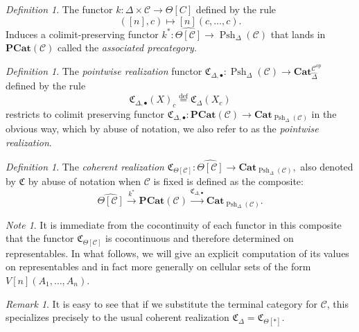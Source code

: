 \documentclass[leqno]{article}
\numberwithin{equation}{subsection}
\theoremstyle{plain}   %
\theoremstyle{remark}
\newtheorem{rem}[equation]{Remark}
\newtheorem{note}[equation]{Note}
\newtheorem{defn}[equation]{Definition}
\theoremstyle{plain}
\newcommand{\op}{\ensuremath{\mathrm{op}}}
\newcommand{\Cat}{\ensuremath{\mathbf{Cat}}}
\newcommand{\psh}[1]{\ensuremath{\widehat{#1}}}
\renewcommand{\C}{\ensuremath{\mathcal{C}}}
\newcommand{\defeq}{\overset{\mathrm{def}}=}
\newcommand{\cellset}{\ensuremath{\widehat{\Theta[\mathcal{C}]}}}
\newcommand{\spsh}{\ensuremath{\operatorname{Psh}_\Delta(\mathcal{C})}}
\begin{document}
\begin{defn}
	The functor \(k: \Delta \times \C\to \Theta[C]\) defined by the rule 
	\[
		([n],c) \mapsto [n](c,\dots,c).
	\]
	Induces a colimit-preserving functor \(k^\ast: \cellset \to \spsh\) that lands in \(\mathbf{PCat}(\C)\) called the \emph{associated precategory}.
\end{defn}

\begin{defn}\label{pointwisedefn}
	The \emph{pointwise realization} functor \(\mathfrak{C}_{\Delta,\bullet}: \spsh \to \Cat_{\psh{\Delta}}^{\C^\op}\) defined by the rule 
	\[
		\mathfrak{C}_{\Delta,\bullet}(X)_c \defeq \mathfrak{C}_{\Delta}(X_c)
	\]
		restricts to colimit preserving functor \(\mathfrak{C}_{\Delta,\bullet}: \mathbf{PCat}(\C) \to \Cat_{\spsh}\) in the obvious way, which by abuse of notation, we also refer to as the \emph{pointwise realization}.
\end{defn}

\begin{defn}
	The \emph{coherent realization} \(\mathfrak{C}_{\Theta[\C]}:\cellset \to \Cat_{\spsh},\) also denoted by \(\mathfrak{C}\) by abuse of notation when \(\C\) is fixed is defined as the composite: 
	\[
		\cellset \xrightarrow{k^\ast} \mathbf{PCat}(\C) \xrightarrow{\mathfrak{C}_{\Delta,\bullet}} \Cat_{\spsh}.
	\] 
\end{defn}
\begin{note}
	It is immediate from the cocontinuity of each functor in this composite that the functor \(\mathfrak{C}_{\Theta[\C]}\) is cocontinuous and therefore determined on representables. In what follows, we will give an explicit computation of its values on representables and in fact more generally on cellular sets of the form \(V[n](A_1,\dots,A_n)\).
\end{note}
\begin{rem}
	It is easy to see that if we substitute the terminal category for \(\C\), this specializes precisely to the usual coherent realization \(\mathfrak{C}_{\Delta} = \mathfrak{C}_{\Theta[\ast]}\).  
\end{rem}
\end{document}
